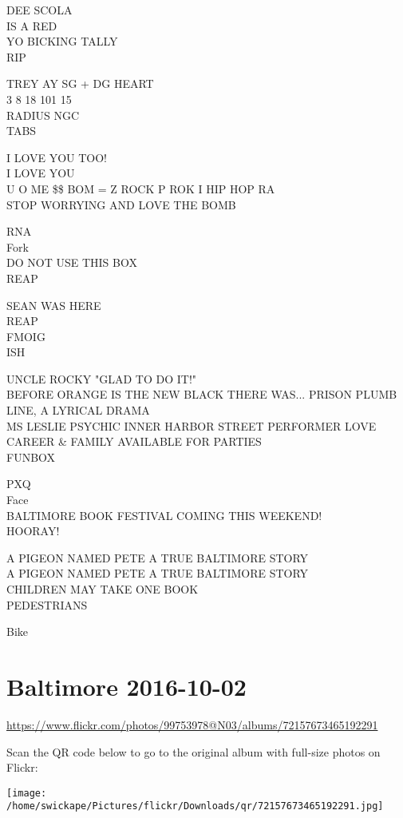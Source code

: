 \documentclass[10pt,letterpaper]{article}
\begin{document}
DEE SCOLA\\
IS A RED\\
YO BICKING TALLY\\
RIP

TREY AY SG + DG HEART\\
3 8 18 101 15\\
RADIUS NGC\\
TABS

I LOVE YOU TOO!\\
I LOVE YOU\\
U O ME \$\$ BOM = Z ROCK P ROK I HIP HOP RA\\
STOP WORRYING AND LOVE THE BOMB

RNA\\
Fork\\
DO NOT USE THIS BOX\\
REAP

SEAN WAS HERE\\
REAP\\
FMOIG\\
ISH

UNCLE ROCKY "GLAD TO DO IT!"\\
BEFORE ORANGE IS THE NEW BLACK THERE WAS... PRISON PLUMB LINE, A LYRICAL DRAMA\\
MS LESLIE PSYCHIC INNER HARBOR STREET PERFORMER LOVE CAREER \& FAMILY AVAILABLE FOR PARTIES\\
FUNBOX

PXQ\\
Face\\
BALTIMORE BOOK FESTIVAL COMING THIS WEEKEND!\\
HOORAY!

A PIGEON NAMED PETE A TRUE BALTIMORE STORY\\
A PIGEON NAMED PETE A TRUE BALTIMORE STORY\\
CHILDREN MAY TAKE ONE BOOK\\
PEDESTRIANS

Bike


\section*{Baltimore 2016-10-02}

\url{https://www.flickr.com/photos/99753978@N03/albums/72157673465192291}

Scan the QR code below to go to the original album with full-size photos on Flickr:

\texttt{[image: /home/swickape/Pictures/flickr/Downloads/qr/72157673465192291.jpg]}
\end{document}
